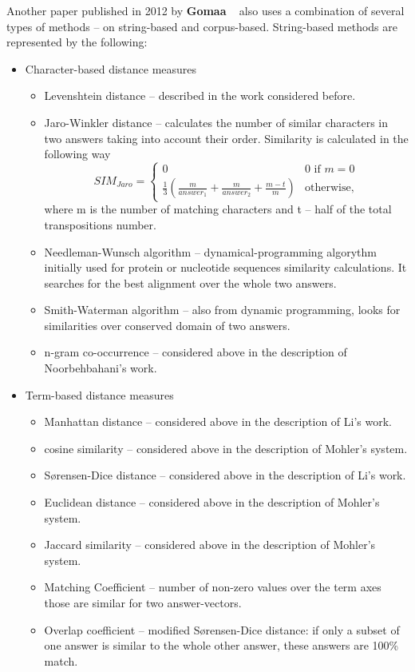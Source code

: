 \documentclass[11pt]{report}
\numberwithin{equation}{section} %
\begin{document}
Another paper published in 2012 by \textbf{Gomaa} ~\cite{Gomaa} also uses a combination of several types of methods -- on string-based and corpus-based. String-based methods are represented by the following:
\begin{itemize}
\item Character-based distance measures
\begin{itemize}
\item Levenshtein distance -- described in the work considered before.
\item Jaro-Winkler distance -- calculates the number of similar characters in two answers taking into account their order. Similarity is calculated in the following way ~\cite{Jaro}
\begin{equation} \label{eq:Jaro}
SIM_{Jaro} = \begin{cases}
   0 &\text{0 if $m = 0$}\\
   \text{$\frac{1}{3}(\frac{m}{answer_1} + \frac{m}{answer_2} + \frac{m - t}{m})$}&\text{otherwise},
 \end{cases}
\end{equation}
where m is the number of matching characters and t -- half of the total transpositions number.
\item Needleman-Wunsch algorithm -- dynamical-programming algorythm initially used for protein or nucleotide sequences similarity calculations. It searches for the best alignment over the whole two answers.
\item Smith-Waterman algorithm -- also from dynamic programming, looks for similarities over conserved domain of two answers. 
\item n-gram co-occurrence -- considered above in the description of Noorbehbahani's work.
\end{itemize}
\item Term-based distance measures
\begin{itemize}
\item Manhattan distance -- considered above in the description of Li's work.
\item cosine similarity -- considered above in the description of Mohler's system.
\item S{\o}rensen-Dice distance -- considered above in the description of Li's work.
\item Euclidean distance -- considered above in the description of Mohler's system.
\item Jaccard similarity -- considered above in the description of Mohler's system.
\item Matching Coefficient -- number of non-zero values over the term axes those are similar for two answer-vectors.
\item Overlap coefficient -- modified S{\o}rensen-Dice distance: if only a subset of one answer is similar to the whole other answer, these answers are 100\% match.
\end{itemize}
\end{itemize}
\end{document}
